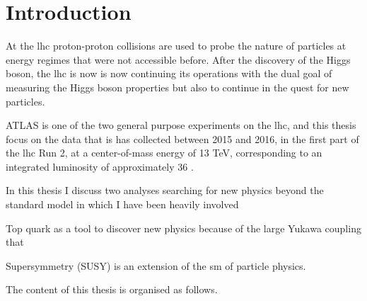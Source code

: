 \chapter*{Introduction}

At the \gls{lhc} proton-proton collisions are used to probe the nature of particles at energy regimes that were not accessible before. 
After the discovery of the Higgs boson, the \gls{lhc} is now is now continuing its operations with the dual goal 
of measuring the Higgs boson properties but also to continue in the quest for new particles.

ATLAS is one of the two general purpose experiments on the \gls{lhc}, and this thesis focus on the data that is has collected between 
2015 and 2016, in the first part of the \gls{lhc} Run 2, at a center-of-mass energy of 13 TeV, corresponding to an 
integrated luminosity of approximately 36 \ifb. 

In this thesis I discuss two analyses searching for new physics beyond the standard model in which 
I have been heavily involved 

Top quark as a tool to discover new physics because of the large Yukawa coupling that 

Supersymmetry (SUSY) is an extension of the \gls{sm} of particle physics. 

The content of this thesis is organised as follows. 

